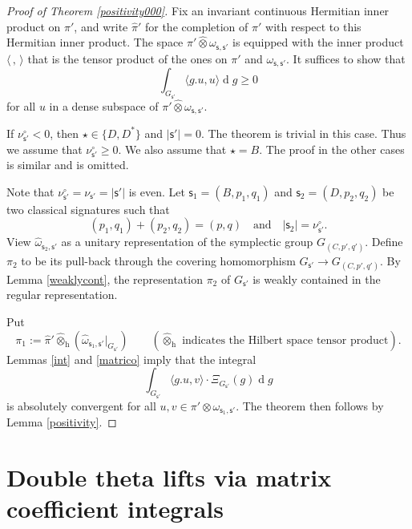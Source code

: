 \documentclass[12pt,a4paper]{amsart}
\def\abs#1{\left|{#1}\right|}
\newcommand{\od}{\operatorname{d}}
\newcommand{\la}{\langle}
\newcommand{\ra}{\rangle}
\numberwithin{equation}{section}
\theoremstyle{remark}
\begin{document}
\begin{proof}[Proof of Theorem \ref{positivity000}]
Fix an invariant continuous Hermitian inner product on $\pi'$, and  write $\hat \pi'$ for the completion of $\pi'$ with respect to this Hermitian inner product. 
The space $\pi' \widehat \otimes \omega_{\mathsf s, \mathsf s'}$ is equipped with the  inner product $\la\,,\,\ra$  that is the tensor product of the ones on $\pi'$ and $\omega_{\mathsf s, \mathsf s'} $. It suffices to show that 
\[
  \int_{G_{\mathsf s'}}\la g.u,u\ra\od\! g\geq 0
\]
for all $u$ in a dense subspace of $\pi' \widehat \otimes \omega_{\mathsf s, \mathsf s'}$. 

If $\nu^\circ_{\mathsf s'}<0$, then $\star\in \{D, D^*\}$ and $\abs{\mathsf s'}=0$. The theorem is trivial in this case.  Thus we assume that $\nu^\circ_{\mathsf s'}\geq 0$.  
We also assume that $\star=B$. The proof in the other cases is similar and is omitted. 

Note that $\nu^\circ_{\mathsf s'}=\nu_{\mathsf s'}=\abs{\mathsf s'}$ is even.
 Let $\mathsf s_1=(B, p_1, q_1)$ and  $\mathsf s_2=(D, p_2, q_2)$ be two classical signatures such that
\[
  (p_1, q_1)+(p_2, q_2)=(p,q)\quad \textrm{and}\quad \abs{\mathsf s_2}=\nu^\circ_{\mathsf s'}.
\]
View $\hat \omega_{\mathsf s_2, \mathsf s'}$ as a unitary representation of the symplectic group $G_{(C, p',q')}$. 
Define $\pi_2$ to be its  pull-back through the covering homomorphism $G_{\mathsf s'}\rightarrow G_{(C, p',q')}$. By Lemma \ref{weaklycont}, the representation $\pi_2$ of $G_{\mathsf s'}$ is weakly contained in the regular representation. 

Put 
\[
  \pi_1:=\hat \pi'\widehat \otimes_{\mathrm h} (\hat \omega_{\mathsf s_1, \mathsf s'}|_{G_{\mathsf s'}})\qquad (\textrm{$\widehat \otimes_{\mathrm h}$ indicates the Hilbert space tensor product}).
\]
 Lemmas  \ref{int} and \ref{matrico} imply that the integral 
\[
 \int_{G_{\mathsf s'}} \la g.u,v\ra \cdot \Xi_{G_{\mathsf s'}}(g)\od\!g
\]
is absolutely convergent for all $u,v\in \pi' \otimes \omega_{\mathsf s_1, \mathsf s'}$. The theorem then follows by Lemma \ref{positivity}. 



\end{proof}



\section{Double theta lifts via matrix coefficient integrals}
\end{document}
